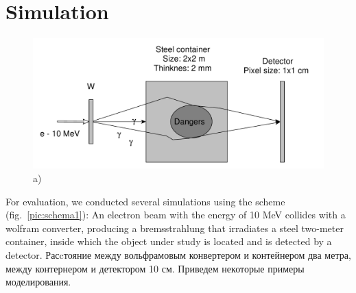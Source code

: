 \documentclass[a4paper]{panl}
\begin{document}
\section*{Simulation}
\begin{figure}[t]
    \begin{center}
        \includegraphics[width=120mm]{figures/yed_schema_1.pdf}
        \vspace{-3mm}
        \caption{a) }
    \end{center}
    \vspace{-5mm}
\end{figure}
For evaluation, we conducted several simulations using the scheme (fig.~\ref{pic:schema1}):
An electron beam with the energy of 10 MeV collides with a wolfram converter, producing a bremsstrahlung that irradiates a steel two-meter container, inside which the object under study is located and is detected by a detector. Расcтояние между вольфрамовым конвертером и контейнером два метра, между контернером и детектором 10 см. Приведем некоторые примеры моделирования.
\end{document}
